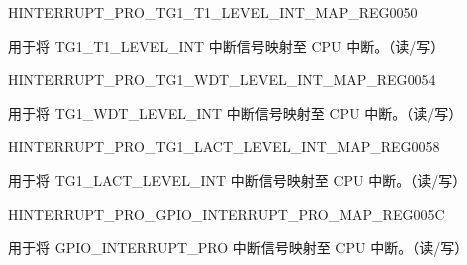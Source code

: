 \begin{register}{H}{INTERRUPT\_PRO\_TG1\_T1\_LEVEL\_INT\_MAP\_REG}{\hexprefix{}0050}\label{regdesc:INTERRUPTPROTG1T1LEVELINTMAPREG}
%
%
\regnewline%
\begin{regdesc}\begin{reglist}
\label{fielddesc:INTERRUPTPROTG1T1LEVELINTMAP}\item [INTERRUPT\_PRO\_TG1\_T1\_LEVEL\_INT\_MAP] 用于将 TG1\_T1\_LEVEL\_INT 中断信号映射至 CPU 中断。（读/写）
\end{reglist}\end{regdesc}
\end{register}


\begin{register}{H}{INTERRUPT\_PRO\_TG1\_WDT\_LEVEL\_INT\_MAP\_REG}{\hexprefix{}0054}\label{regdesc:INTERRUPTPROTG1WDTLEVELINTMAPREG}
%
%
\regnewline%
\begin{regdesc}\begin{reglist}
\label{fielddesc:INTERRUPTPROTG1WDTLEVELINTMAP}\item [INTERRUPT\_PRO\_TG1\_WDT\_LEVEL\_INT\_MAP] 用于将 TG1\_WDT\_LEVEL\_INT 中断信号映射至 CPU 中断。（读/写）
\end{reglist}\end{regdesc}
\end{register}


\begin{register}{H}{INTERRUPT\_PRO\_TG1\_LACT\_LEVEL\_INT\_MAP\_REG}{\hexprefix{}0058}\label{regdesc:INTERRUPTPROTG1LACTLEVELINTMAPREG}
%
%
\regnewline%
\begin{regdesc}\begin{reglist}
\label{fielddesc:INTERRUPTPROTG1LACTLEVELINTMAP}\item [INTERRUPT\_PRO\_TG1\_LACT\_LEVEL\_INT\_MAP] 用于将 TG1\_LACT\_LEVEL\_INT 中断信号映射至 CPU 中断。（读/写）
\end{reglist}\end{regdesc}
\end{register}


\begin{register}{H}{INTERRUPT\_PRO\_GPIO\_INTERRUPT\_PRO\_MAP\_REG}{\hexprefix{}005C}\label{regdesc:INTERRUPTPROGPIOINTERRUPTPROMAPREG}
%
%
\regnewline%
\begin{regdesc}\begin{reglist}
\label{fielddesc:INTERRUPTPROGPIOINTERRUPTPROMAP}\item [INTERRUPT\_PRO\_GPIO\_INTERRUPT\_PRO\_MAP] 用于将 GPIO\_INTERRUPT\_PRO 中断信号映射至 CPU 中断。（读/写）
\end{reglist}\end{regdesc}
\end{register}


